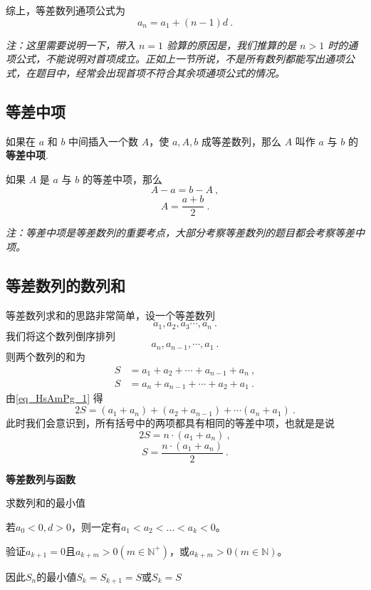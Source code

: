 综上，等差数列通项公式为
\begin{equation}
a_n = a_1 + (n - 1)d~.
\end{equation}

\textsl{注：这里需要说明一下，带入 $n = 1$ 验算的原因是，我们推算的是 $n > 1$ 时的通项公式，不能说明对首项成立。正如上一节所说，不是所有数列都能写出通项公式，在题目中，经常会出现首项不符合其余项通项公式的情况。}

\subsection{等差中项}
如果在 $a$ 和 $b$ 中间插入一个数 $A$，使 $a,A,b$ 成等差数列，那么 $A$ 叫作 $a$ 与 $b$ 的\textbf{等差中项}.

如果 $A$ 是 $a$ 与 $b$ 的等差中项，那么
\begin{equation}
A - a = b - A~,
\end{equation}
\begin{equation}
A = \frac{a+b}{2}~.
\end{equation}

\textsl{注：等差中项是等差数列的重要考点，大部分考察等差数列的题目都会考察等差中项。}

\subsection{等差数列的数列和}

等差数列求和的思路非常简单，设一个等差数列
\begin{equation}
a_1,a_2,a_3\cdots,a_n~.
\end{equation}
我们将这个数列倒序排列
\begin{equation}
a_n,a_{n-1},\cdots,a_1~.
\end{equation}
则两个数列的和为
\begin{equation}\label{eq_HsAmPg_1}
\begin{aligned}
S &= a_1 + a_2 + \cdots + a_{n-1} + a_n ~,\\
S &= a_n + a_{n - 1} + \cdots + a_2 + a_1~.
\end{aligned}
\end{equation}
由\autoref{eq_HsAmPg_1} 得
\begin{equation}
2S = (a_1+a_n) + (a_2+a_{n-1}) +\cdots (a_n + a_1)~.
\end{equation}
此时我们会意识到，所有括号中的两项都具有相同的等差中项，也就是是说
\begin{equation}
2S = n \cdot (a_1+a_n)~,
\end{equation}
\begin{equation}
S = \frac{n\cdot(a_1+a_n)}{2}~.
\end{equation}

\textbf{等差数列与函数}

求数列和的最小值

若$a_0<0,d>0$，则一定有$a_1<a_2<\dots<a_{k}<0$。

验证$a_{k+1} =0$且$a_{k+m}>0(m\in\mathbb{N}^+)$，或$a_{k+m}>0(m\in\mathbb{N})$。

因此$S_n$的最小値$S_k=S_{k+1}=S$或$S_k=S$